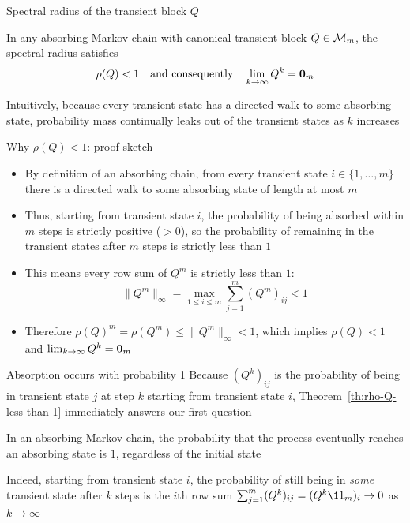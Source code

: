 \documentclass[aspectratio=169]{beamer}\usepackage[]{graphicx}\usepackage[]{xcolor}
\begin{document}

\begin{frame}{Spectral radius of the transient block $Q$}
\begin{theorem}
\label{th:rho-Q-less-than-1}
In any absorbing Markov chain with canonical transient block $Q \in \mathcal{M}_m$, the spectral radius satisfies
\[
\rho(Q) < 1 \quad \text{and consequently} \quad \lim_{k \to \infty} Q^k = \b0_m
\]
\end{theorem}
\vfill
Intuitively, because every transient state has a directed walk to some absorbing state, probability mass continually leaks out of the transient states as $k$ increases
\end{frame}

\begin{frame}{Why $\rho(Q) < 1$: proof sketch}
\begin{itemize}
\item By definition of an absorbing chain, from every transient state $i \in \{1,\ldots,m\}$ there is a directed walk to some absorbing state of length at most $m$
\vfill
\item Thus, starting from transient state $i$, the probability of being absorbed within $m$ steps is strictly positive ($> 0$), so the probability of remaining in the transient states after $m$ steps is strictly less than $1$
\vfill
\item This means every row sum of $Q^m$ is strictly less than $1$:
\[
\|Q^m\|_\infty = \max_{1 \le i \le m} \sum_{j=1}^m (Q^m)_{ij} < 1
\]
\vfill
\item Therefore $\rho(Q)^m = \rho(Q^m) \le \|Q^m\|_\infty < 1$, which implies $\rho(Q) < 1$ and $\lim_{k\to\infty} Q^k = \b0_m$
\end{itemize}
\end{frame}

\begin{frame}{Absorption occurs with probability 1}
Because $(Q^k)_{ij}$ is the probability of being in transient state $j$ at step $k$ starting from transient state $i$, Theorem~\ref{th:rho-Q-less-than-1} immediately answers our first question
\vfill
\begin{importanttheorem}
In an absorbing Markov chain, the probability that the process eventually reaches an absorbing state is $1$, regardless of the initial state
\end{importanttheorem}
\vfill
Indeed, starting from transient state $i$, the probability of still being in \emph{some} transient state after $k$ steps is the $i$th row sum $\sum_{j=1}^m (Q^k)_{ij} = (Q^k \11_m)_i \to 0$ as $k \to \infty$
\end{frame}
\end{document}
